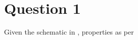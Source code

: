 \chapter{Question 1}
\label{chap:q1}

Given the schematic in \cite{assign}, properties as per \citep{fluids}